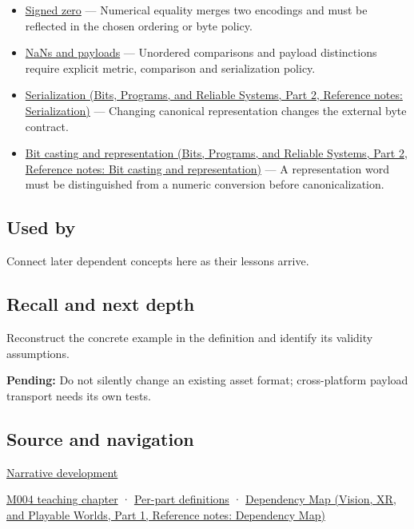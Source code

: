 \begin{itemize}
\tightlist
\item
  \hyperref[appendix-3a048f032c1f]{Signed zero} --- Numerical equality merges two encodings and must be reflected in the chosen ordering or byte policy.
\item
  \hyperref[appendix-d6607cc4c235]{NaNs and payloads} --- Unordered comparisons and payload distinctions require explicit metric, comparison and serialization policy.
\item
  \href{../01-Bits-Programs-and-Reliable-Systems-P02/main.pdf\#nameddest=appendix-91d09ebed979}{Serialization (Bits, Programs, and Reliable Systems, Part 2, Reference notes: Serialization)} --- Changing canonical representation changes the external byte contract.
\item
  \href{../01-Bits-Programs-and-Reliable-Systems-P02/main.pdf\#nameddest=appendix-34ee45f161c1}{Bit casting and representation (Bits, Programs, and Reliable Systems, Part 2, Reference notes: Bit casting and representation)} --- A representation word must be distinguished from a numeric conversion before canonicalization.
\end{itemize}

\subsection{Used by}\label{appendix-e90053a4b201-used-by}

\hypertarget{appendix-e90053a4b201-used-by}{}

Connect later dependent concepts here as their lessons arrive.

\subsection{Recall and next depth}\label{appendix-e90053a4b201-recall-and-next-depth}

\hypertarget{appendix-e90053a4b201-recall-and-next-depth}{}

Reconstruct the concrete example in the definition and identify its validity assumptions.

\textbf{Pending:} Do not silently change an existing asset format; cross-platform payload transport needs its own tests.

\subsection{Source and navigation}\label{appendix-e90053a4b201-source-and-navigation}

\hypertarget{appendix-e90053a4b201-source-and-navigation}{}

\hyperref[01-foundations-i-ch001-choosing-what-information-to-keep]{Narrative development}

\hyperref[01-foundations-i-ch001-a-stretching-ruler-for-real-valued-quantities]{M004 teaching chapter} · \hyperref[appendix-fd090d982a15-m004---parts-61-76]{Per-part definitions} · \href{../07-Vision-XR-and-Playable-Worlds-P01/main.pdf\#nameddest=appendix-4ad47bdd269a}{Dependency Map (Vision, XR, and Playable Worlds, Part 1, Reference notes: Dependency Map)}
